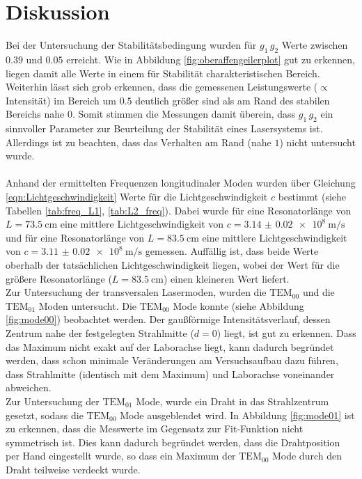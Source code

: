 \section{Diskussion}
\label{sec:Diskussion}

Bei der Untersuchung der Stabilitätsbedingung wurden für $g_{1} \, g_{2}$
Werte zwischen $0.39$ und $0.05$ erreicht.
Wie in Abbildung \ref{fig:oberaffengeilerplot} gut zu erkennen, liegen damit alle Werte
in einem für Stabilität charakteristischen Bereich.
Weiterhin lässt sich grob erkennen, dass die gemessenen Leistungswerte ($\propto$Intensität)
im Bereich um $0.5$ deutlich größer sind als am Rand des stabilen Bereichs nahe $0$.
Somit stimmen die Messungen damit überein, dass $g_{1} \, g_{2}$ ein sinnvoller Parameter zur
Beurteilung der Stabilität eines Lasersystems ist. Allerdings ist zu beachten, dass das Verhalten am
Rand (nahe $1$) nicht untersucht wurde.\\ \\


Anhand der ermittelten Frequenzen longitudinaler Moden wurden über Gleichung \eqref{eqn:Lichtgeschwindigkeit}
Werte für die Lichtgeschwindigkeit $c$ bestimmt (siehe Tabellen \ref{tab:freq_L1}, \ref{tab:L2_freq}).
Dabei wurde für eine Resonatorlänge von $L = \SI{73.5}{\centi\meter}$ eine mittlere
Lichtgeschwindigkeit von $ c = \SI{3.14(2) e8}{\meter\per\second}$
und für eine Resonatorlänge von $L = \SI{83.5}{\centi\meter}$ eine mittlere
Lichtgeschwindigkeit von $ c = \SI{3.11(2) e8}{\meter\per\second}$ gemessen.
Auffällig ist, dass beide Werte oberhalb der tatsächlichen Lichtgeschwindigkeit
liegen, wobei der Wert für die größere Resonatorlänge ($L = \SI{83.5}{\centi\meter}$)
einen kleineren Wert liefert.\\
Zur Untersuchung der transversalen Lasermoden, wurden die \textbf{$\text{TEM}_{00}$}
und die \textbf{$\text{TEM}_{01}$} Moden untersucht.
Die \textbf{$\text{TEM}_{00}$} Mode konnte (siehe Abbildung \ref{fig:mode00})
beobachtet werden. Der gaußförmige Intensitätsverlauf, dessen Zentrum nahe der
festgelegten Strahlmitte ($d = 0$) liegt, ist gut zu erkennen.
Dass das Maximum nicht exakt auf der Laborachse liegt, kann dadurch begründet werden,
dass schon minimale Veränderungen am Versuchsaufbau dazu führen, dass Strahlmitte (identisch mit dem Maximum) und
Laborachse voneinander abweichen.\\
Zur Untersuchung der \textbf{$\text{TEM}_{01}$} Mode, wurde ein Draht in das
Strahlzentrum gesetzt, sodass die \textbf{$\text{TEM}_{00}$} Mode ausgeblendet wird.
In Abbildung \ref{fig:mode01} ist zu erkennen, dass die Messwerte im Gegensatz zur
Fit-Funktion nicht symmetrisch ist. Dies kann dadurch begründet werden, dass die
Drahtposition per Hand eingestellt wurde, so dass ein Maximum der \textbf{$\text{TEM}_{00}$}
Mode durch den Draht teilweise verdeckt wurde.


